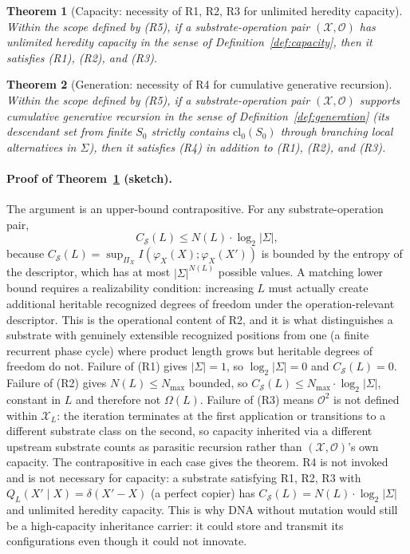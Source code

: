 \documentclass[aps,prx,reprint,amsmath,amssymb,floatfix,superscriptaddress,nofootinbib]{revtex4-2}
\theoremstyle{plain-thm}
\newtheorem{theorem}{Theorem}
\theoremstyle{definition-thm}
\newcommand{\Csub}{C_{\mathcal{S}}}
\newcommand{\descX}{\varphi_X}
\newcommand{\Xset}{\mathcal{X}}
\newcommand{\Op}{\mathcal{O}}
\begin{document}
\begin{theorem}[Capacity: necessity of R1, R2, R3 for unlimited heredity capacity]
\label{thm:capacity}
Within the scope defined by \textnormal{(R5)}, if a substrate-operation pair $(\Xset, \Op)$ has unlimited heredity capacity in the sense of Definition~\ref{def:capacity}, then it satisfies \textnormal{(R1)}, \textnormal{(R2)}, and \textnormal{(R3)}.
\end{theorem}

\begin{theorem}[Generation: necessity of R4 for cumulative generative recursion]
\label{thm:generation}
Within the scope defined by \textnormal{(R5)}, if a substrate-operation pair $(\Xset, \Op)$ supports cumulative generative recursion in the sense of Definition~\ref{def:generation} (its descendant set from finite $S_0$ strictly contains $\mathrm{cl}_0(S_0)$ through branching local alternatives in $\Sigma$), then it satisfies \textnormal{(R4)} in addition to \textnormal{(R1)}, \textnormal{(R2)}, and \textnormal{(R3)}.
\end{theorem}

\paragraph{Proof of Theorem~\ref{thm:capacity} (sketch).} The argument is an upper-bound contrapositive. For any substrate-operation pair,
\begin{equation}
\Csub(L) \le N(L) \cdot \log_2 |\Sigma|,
\label{eq:capacity_upper_bound}
\end{equation}
because $\Csub(L) = \sup_{\Pi_X} I(\descX(X); \descX(X'))$ is bounded by the entropy of the descriptor, which has at most $|\Sigma|^{N(L)}$ possible values. A matching lower bound requires a realizability condition: increasing $L$ must actually create additional heritable recognized degrees of freedom under the operation-relevant descriptor. This is the operational content of R2, and it is what distinguishes a substrate with genuinely extensible recognized positions from one (a finite recurrent phase cycle) where product length grows but heritable degrees of freedom do not. Failure of (R1) gives $|\Sigma| = 1$, so $\log_2 |\Sigma| = 0$ and $\Csub(L) = 0$. Failure of (R2) gives $N(L) \le N_{\max}$ bounded, so $\Csub(L) \le N_{\max} \cdot \log_2 |\Sigma|$, constant in $L$ and therefore not $\Omega(L)$. Failure of (R3) means $\Op^2$ is not defined within $\Xset_L$: the iteration terminates at the first application or transitions to a different substrate class on the second, so capacity inherited via a different upstream substrate counts as parasitic recursion rather than $(\Xset, \Op)$'s own capacity. The contrapositive in each case gives the theorem. R4 is not invoked and is not necessary for capacity: a substrate satisfying R1, R2, R3 with $Q_L(X' \mid X) = \delta(X' - X)$ (a perfect copier) has $\Csub(L) = N(L) \cdot \log_2 |\Sigma|$ and unlimited heredity capacity. This is why DNA without mutation would still be a high-capacity inheritance carrier: it could store and transmit its configurations even though it could not innovate.
\end{document}
